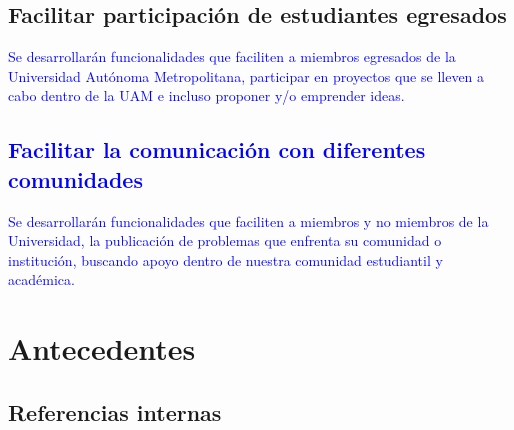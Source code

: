 \documentclass[11pt,letterpaper,titlepage]{article}
\begin{document}
\subsection{Facilitar participaci\'on de estudiantes egresados}\textcolor{blue}{
Se desarrollar\'an funcionalidades que faciliten a miembros egresados de la Universidad Aut\'onoma Metropolitana, participar en proyectos que se lleven a cabo dentro de la UAM e incluso proponer y/o emprender ideas. }
\textcolor{blue}{
\subsection{Facilitar la comunicaci\'on con diferentes comunidades}
Se desarrollar\'an funcionalidades que faciliten a miembros y no miembros de la Universidad, la publicaci\'on de problemas que enfrenta su comunidad o instituci\'on, buscando apoyo dentro de nuestra comunidad estudiantil y acad\'emica. }


\section{Antecedentes}
\subsection{Referencias internas}
\end{document}
